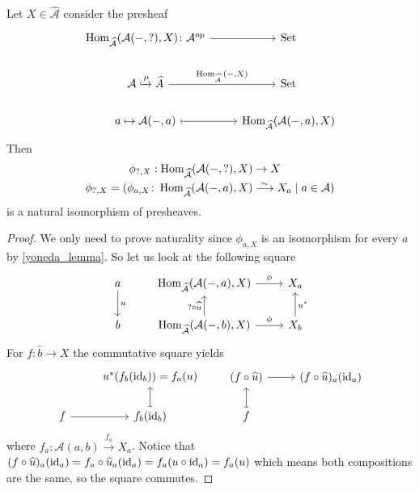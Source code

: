 \begin{prop}
    Let $X \in \widehat{\mathcal{A}} $ consider the presheaf
    \[
    \begin{tikzcd}
        \Hom_{\widehat{\mathcal{A}}}(\mathcal{A}(-,?) , X ) \colon \mathcal{A}^{\op} 
        \arrow[r]
        &
        \Set
        \\
        \mathcal{A}
        \xhookrightarrow{\mu}
        \widehat{A}
        \arrow[r, "\Hom_{\widehat{\mathcal{A}}}{( -, X )}"]
        &
        \Set
        \\
        a \mapsto \mathcal{A}(-,a)
        \arrow[r, mapsto]
        &
        \Hom_{\widehat{\mathcal{A}}}(\mathcal{A}(-,a),X)
    \end{tikzcd}
    \]
    Then 
    \begin{align*}
    	\phi_{?,X}: \Hom_{\widehat{\mathcal{A}}}(\mathcal{A}(-,?),X) 
    	&\to 
    	X
    	\\
	    \phi_{?,X}=(\phi_{a,X}\colon\Hom_{\widehat{\mathcal{A}}}(\mathcal{A}(-,a),X) 
	    &\isomorphism 
	    X_a \mid a \in \mathcal{A})
    \end{align*}
    is a natural isomorphism of presheaves.
\end{prop}

\begin{proof}
    We only need to prove naturality since $\phi_{a,X}$ is an isomorphism for every $a$ by \cref{yoneda_lemma}.
    So let us look at the following square
    \[
    \begin{tikzcd}
        a 
        \arrow[d, "u"]       
        &
        \Hom_{\widehat{\mathcal{A}}}(\mathcal{A}(-,a),X) 
        \arrow[r , "\phi"]
        &
        X_a
        \\
        b 
        &
        \Hom_{\widehat{\mathcal{A}}}(\mathcal{A}(-,b),X) 
        \arrow[r, "\phi"]
        \arrow[u,"? \circ \widehat{u}"]
        &
        X_b
        \arrow[u, "u^*"']
    \end{tikzcd}
    \]
    For $f\colon \widehat{b} \to X$ the commutative square yields
    \[
    \begin{tikzcd}
        &
        u^*(f_b(\id_b))=f_a(u)
        \\
        f
        \arrow[r]
        &
        f_b(\id_b)
        \arrow[u, mapsto]
    \end{tikzcd}
    \qquad
    \begin{tikzcd}
        (f \circ \widehat{u})
        \arrow[r]
        &
        (f \circ \widehat{u})_a(\id_a)
        \\
        f
        \arrow[u, mapsto]
    \end{tikzcd}
    \]
    where $f_a \colon \mathcal{A}(a,b) \xrightarrow{f_a}X_a$.
    Notice that $ (f\circ\widehat{u})_a(\operatorname{id}_a) = f_a \circ \widehat{u}_a ( \operatorname{id}_a) = f_a ( u \circ \operatorname{id}_a) = f_a(u)$ which means both compositions 
    are the same, so the square commutes. 

\end{proof}

